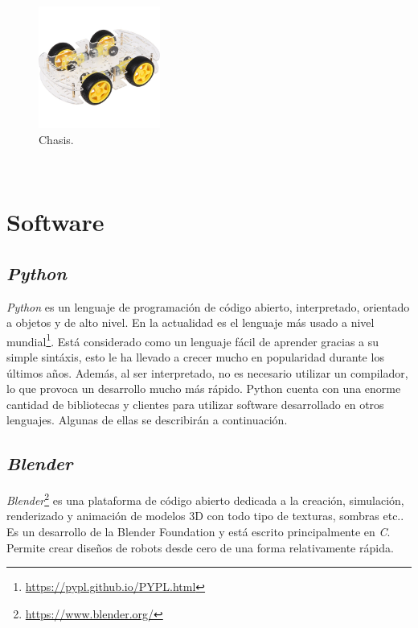 \begin{figure} [h!]
	\begin{center}
		\includegraphics[width=4cm]{figs/chasis}
	\end{center}
	\caption{Chasis.}
	\label{fig:chasis}
\end{figure}\

\section{Software}

\subsection{\textit{Python}}
\textit{Python} es un lenguaje de programación de código abierto, interpretado, orientado a objetos y de alto nivel. En la actualidad es el lenguaje más usado a nivel mundial\footnote{\url{https://pypl.github.io/PYPL.html}}. Está considerado como un lenguaje fácil de aprender gracias a su simple sintáxis, esto le ha llevado a crecer mucho en popularidad durante los últimos años. Además, al ser interpretado, no es necesario utilizar un compilador, lo que provoca un desarrollo mucho más rápido. Python cuenta con una enorme cantidad de bibliotecas y clientes para utilizar software desarrollado en otros lenguajes. Algunas de ellas se describirán a continuación.\\

\subsection{\textit{Blender}}
\textit{Blender}\footnote{\url{https://www.blender.org/}} es una plataforma de código abierto dedicada a la creación, simulación, renderizado y animación de modelos 3D con todo tipo de texturas, sombras etc.. Es un desarrollo de la Blender Foundation y está escrito principalmente en \textit{C}. Permite crear diseños de robots desde cero de una forma relativamente rápida.\\

